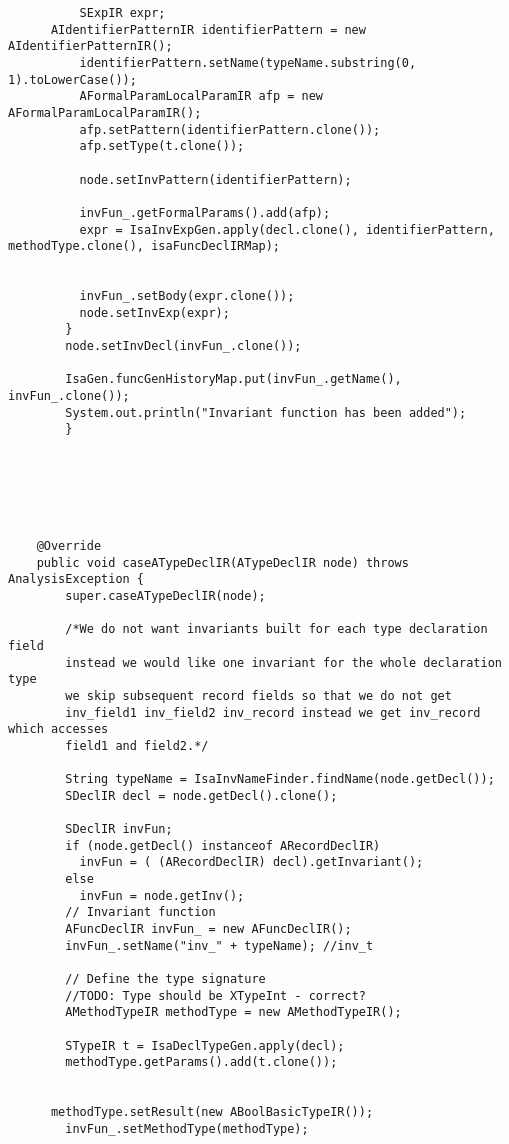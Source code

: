 \begin{appendices}
\begin{lstlisting}
          SExpIR expr;
      AIdentifierPatternIR identifierPattern = new AIdentifierPatternIR();
          identifierPattern.setName(typeName.substring(0, 1).toLowerCase());
          AFormalParamLocalParamIR afp = new AFormalParamLocalParamIR();
          afp.setPattern(identifierPattern.clone());
          afp.setType(t.clone()); 
          
          node.setInvPattern(identifierPattern);
          
          invFun_.getFormalParams().add(afp);
          expr = IsaInvExpGen.apply(decl.clone(), identifierPattern, methodType.clone(), isaFuncDeclIRMap);
          
          
          invFun_.setBody(expr.clone());
          node.setInvExp(expr);
        }
        node.setInvDecl(invFun_.clone());
        
        IsaGen.funcGenHistoryMap.put(invFun_.getName(), invFun_.clone());
        System.out.println("Invariant function has been added");
        }
        
    
    
    
    
  
    @Override
    public void caseATypeDeclIR(ATypeDeclIR node) throws AnalysisException {
        super.caseATypeDeclIR(node);
        
        /*We do not want invariants built for each type declaration field
        instead we would like one invariant for the whole declaration type
        we skip subsequent record fields so that we do not get
        inv_field1 inv_field2 inv_record instead we get inv_record which accesses
        field1 and field2.*/
        
        String typeName = IsaInvNameFinder.findName(node.getDecl());
        SDeclIR decl = node.getDecl().clone();
         
        SDeclIR invFun;
        if (node.getDecl() instanceof ARecordDeclIR)
          invFun = ( (ARecordDeclIR) decl).getInvariant();
        else
          invFun = node.getInv();
        // Invariant function
        AFuncDeclIR invFun_ = new AFuncDeclIR();
        invFun_.setName("inv_" + typeName); //inv_t

        // Define the type signature
        //TODO: Type should be XTypeInt - correct?
        AMethodTypeIR methodType = new AMethodTypeIR();
        
        STypeIR t = IsaDeclTypeGen.apply(decl);
        methodType.getParams().add(t.clone());
        
          
      methodType.setResult(new ABoolBasicTypeIR());
        invFun_.setMethodType(methodType);
         

\end{lstlisting}
\end{appendices}

